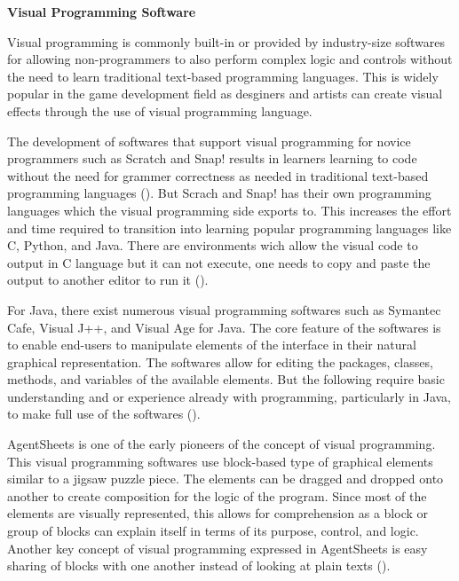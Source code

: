\flushleft
\textbf{Visual Programming Software}\\
\justifying

\parx
Visual programming is commonly built-in or provided by industry-size softwares for
allowing non-programmers to also perform complex logic and controls without the need to
learn traditional text-based programming languages. This is widely popular in the game
development field as desginers and artists can create visual effects through the use of
visual programming language.

The development of softwares that support visual programming for novice programmers such
as Scratch and Snap! results in learners learning to code without the need for grammer
correctness as needed in traditional text-based programming languages
(\cite{bau_gray_kelleher_sheldon_turbak_2017}). But Scrach and Snap! has their own
programming languages which the visual programming side exports to.  This increases the
effort and time required to transition into learning popular programming languages like
C, Python, and Java. There are environments wich allow the visual code to output in
C language but it can not execute, one needs to copy and paste the output to another
editor to run it (\cite{abe_fukawa_tanaka_2019}).

For Java, there exist numerous visual programming softwares such as Symantec Cafe,
Visual J++, and Visual Age for Java. The core feature of the softwares is to enable
end-users to manipulate elements of the interface in their natural graphical
representation. The softwares allow for editing the packages, classes, methods, and
variables of the available elements. But the following require basic understanding and
or experience already with programming, particularly in Java, to make full use of the
softwares (\cite{prokhorov_kosarev}).

AgentSheets is one of the early pioneers of the concept of visual programming. This
visual programming softwares use block-based type of graphical elements similar to
a jigsaw puzzle piece. The elements can be dragged and dropped onto another to create
composition for the logic of the program. Since most of the elements are visually
represented, this allows for comprehension as a block or group of blocks can explain
itself in terms of its purpose, control, and logic. Another key concept of visual
programming expressed in AgentSheets is easy sharing of blocks with one another
instead of looking at plain texts (\cite{repenning_2017}).
